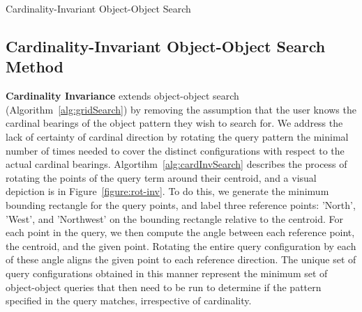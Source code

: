 \begin{algorithm}[h]
    \caption{Cardinality-Invariant Object-Object Search}\label{alg:cardInvSearch}
    \begin{algorithmic}
        \State{- - - - -}
             
                    \EndIf
                \EndFor
            \EndFor
        \EndProcedure
    \end{algorithmic}
\end{algorithm}

\subsection{Cardinality-Invariant Object-Object Search Method}
\textbf{Cardinality Invariance} extends object-object search (Algorithm~\ref{alg:gridSearch}) by removing the assumption that the user knows the cardinal bearings of the object pattern they wish to search for. 
We address the lack of certainty of cardinal direction by rotating the query pattern the minimal number of times needed to cover the distinct configurations with respect to the actual cardinal bearings. 
Algortihm~\ref{alg:cardInvSearch} describes the process of rotating the points of the query term around their centroid, and a visual depiction is in Figure~\ref{figure:rot-inv}.
To do this, we generate the minimum bounding rectangle for the query points, and label three reference points: 'North', 'West', and 'Northwest' on the bounding rectangle relative to the centroid. 
For each point in the query, we then compute the angle between each reference point, the centroid, and the given point. 
Rotating the entire query configuration by each of these angle aligns the given point to each reference direction.
The unique set of query configurations obtained in this manner represent the minimum set of object-object queries that then need to be run to determine if the pattern specified in the query matches, irrespective of cardinality. 